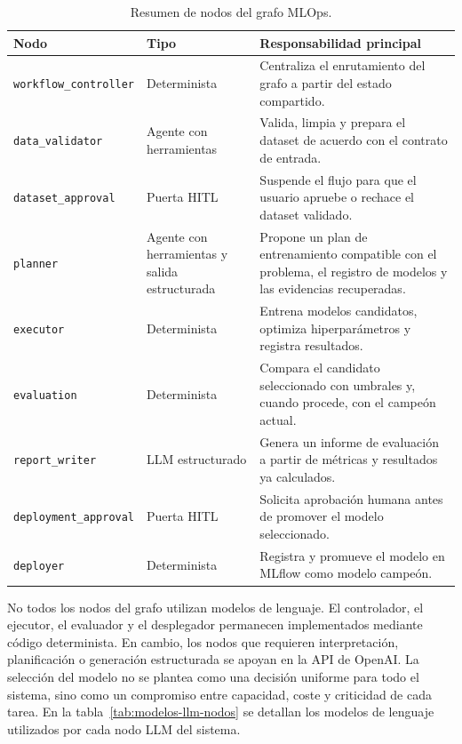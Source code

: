 \documentclass[12pt,a4paper]{article}
\theoremstyle{plain}
\begin{document}
\begin{table}[htbp]
\centering
\footnotesize
\setlength{\tabcolsep}{4pt}
\renewcommand{\arraystretch}{1.05}
\begin{tabularx}{\linewidth}{>{\RaggedRight\arraybackslash}p{3.2cm} >{\RaggedRight\arraybackslash}p{3.4cm} >{\RaggedRight\arraybackslash}X}
\hline
\textbf{Nodo} & \textbf{Tipo} & \textbf{Responsabilidad principal} \\\hline
\texttt{workflow\_controller} & Determinista & Centraliza el enrutamiento del grafo a partir del estado compartido. \\\hline
\texttt{data\_validator} & Agente con herramientas & Valida, limpia y prepara el dataset de acuerdo con el contrato de entrada. \\\hline
\texttt{dataset\_approval} & Puerta HITL & Suspende el flujo para que el usuario apruebe o rechace el dataset validado. \\\hline
\texttt{planner} & Agente con herramientas y salida estructurada & Propone un plan de entrenamiento compatible con el problema, el registro de modelos y las evidencias recuperadas. \\\hline
\texttt{executor} & Determinista & Entrena modelos candidatos, optimiza hiperparámetros y registra resultados. \\\hline
\texttt{evaluation} & Determinista & Compara el candidato seleccionado con umbrales y, cuando procede, con el campeón actual. \\\hline
\texttt{report\_writer} & LLM estructurado & Genera un informe de evaluación a partir de métricas y resultados ya calculados. \\\hline
\texttt{deployment\_approval} & Puerta HITL & Solicita aprobación humana antes de promover el modelo seleccionado. \\\hline
\texttt{deployer} & Determinista & Registra y promueve el modelo en MLflow como modelo campeón. \\\hline
\end{tabularx}
\caption{Resumen de nodos del grafo MLOps.}
\label{tab:nodos-resumen}
\end{table}

No todos los nodos del grafo utilizan modelos de lenguaje. El controlador, el ejecutor, el evaluador y el desplegador permanecen implementados mediante código determinista. En cambio, los nodos que requieren interpretación, planificación o generación estructurada se apoyan en la API de OpenAI. La selección del modelo no se plantea como una decisión uniforme para todo el sistema, sino como un compromiso entre capacidad, coste y criticidad de cada tarea. En la tabla~\ref{tab:modelos-llm-nodos} se detallan los modelos de lenguaje utilizados por cada nodo LLM del sistema. %
\end{document}
